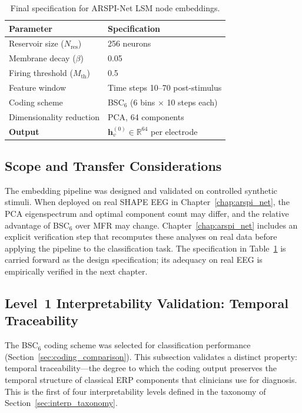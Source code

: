 \begin{table}[H]
    \centering
    \caption{Final specification for ARSPI-Net LSM node embeddings.}
    \label{tab:final_embedding_spec}
    \renewcommand{\arraystretch}{1.2}
    \begin{tabular}{|l|p{8cm}|}
        \hline
        \textbf{Parameter} & \textbf{Specification} \\
        \hline
        Reservoir size ($N_{\text{res}}$) & 256 neurons \\
        Membrane decay ($\beta$) & 0.05 \\
        Firing threshold ($M_{\text{th}}$) & 0.5 \\
        Feature window & Time steps 10--70 post-stimulus \\
        Coding scheme & BSC$_6$ (6 bins $\times$ 10 steps each) \\
        Dimensionality reduction & PCA, 64 components \\
        \textbf{Output} & $\mathbf{h}_v^{(0)} \in \mathbb{R}^{64}$ per electrode \\
        \hline
    \end{tabular}
\end{table}

\subsection{Scope and Transfer Considerations}

The embedding pipeline was designed and validated on controlled synthetic stimuli. When deployed on real SHAPE EEG in Chapter~\ref{chap:arspi_net}, the PCA eigenspectrum and optimal component count may differ, and the relative advantage of BSC$_6$ over MFR may change. Chapter~\ref{chap:arspi_net} includes an explicit verification step that recomputes these analyses on real data before applying the pipeline to the classification task. The specification in Table~\ref{tab:final_embedding_spec} is carried forward as the design specification; its adequacy on real EEG is empirically verified in the next chapter.

\subsection{Level~1 Interpretability Validation: Temporal Traceability}
\label{sec:ch4_temporal_traceability}

The BSC$_6$ coding scheme was selected for classification performance (Section~\ref{sec:coding_comparison}). This subsection validates a distinct property: temporal traceability---the degree to which the coding output preserves the temporal structure of classical ERP components that clinicians use for diagnosis. This is the first of four interpretability levels defined in the taxonomy of Section~\ref{sec:interp_taxonomy}.

